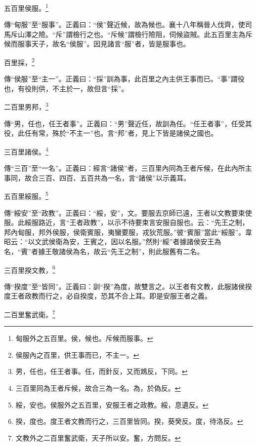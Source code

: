 五百里侯服。\footnote{甸服外之五百里。侯，候也。斥候而服事。}

{\noindent\zhuan{}\fzbyks 傳“甸服”至“服事”。正義曰：“侯”聲近候，故為候也。襄十八年稱晉人伐齊，使司馬斥山澤之險。“斥”謂檢行之也。“斥候”謂檢行險阻，伺候盜賊。此五百里主為斥候而服事天子，故名“侯服”。因見諸言“服”者，皆是服事也。 \par}

百里採，\footnote{侯服內之百里，供王事而已，不主一。}

{\noindent\zhuan{}\fzbyks 傳“侯服”至“主一”。正義曰：“採”訓為事，此百里之內主供王事而已。“事”謂役也，有役則供，不主於一，故但言“採”。 \par}

二百里男邦，\footnote{男，任也，任王者事。任，而針反，又而鴆反，下同。}

{\noindent\zhuan{}\fzbyks 傳“男，任也，任王者事”。正義曰：“男”聲近任，故訓為任。“任王者事”，任受其役，此任有常，殊於“不主一”也。言“邦”者，見上下皆是諸侯之國也。 \par}

三百里諸侯。\footnote{三百里同為王者斥候，故合三為一名。為，於偽反。}

{\noindent\zhuan{}\fzbyks 傳“三百”至“一名”。正義曰：經言“諸侯”者，三百里內同為王者斥候，在此內所主事同，故合三百、四百、五百共為一名，言“諸侯”以示義耳。 \par}

五百里綏服。\footnote{綏，安也。侯服外之五百里，安服王者之政教。綏，息遺反。}

{\noindent\zhuan{}\fzbyks 傳“綏安”至“政教”。正義曰：“綏，安”，文。要服去京師已遠，王者以文教要束使服。此綏服路近，言“王者政教”，以示不待要束言安服自服也。云：“先王之制，邦內甸服，邦外侯服，侯衛賓服，夷蠻要服，戎狄荒服。”彼“賓服”當此“綏服”。韋昭云：“以文武侯衛為安，王賓之，因以名服。”然則“綏”者據諸侯安王為名，“賓”者據王敬諸侯為名，故云“先王之制”，則此服舊有二名。 \par}

三百里揆文教，\footnote{揆，度也。度王者文教而行之，三百里皆同。揆，葵癸反。度，待洛反。}

{\noindent\zhuan{}\fzbyks 傳“揆度”至“皆同”。正義曰：訓“揆”為度，故雙言之。以王者有文教，此服諸侯揆度王者政教而行之，必自揆度，恐其不合上耳。即是安服王者之義。 \par}

二百里奮武衛。\footnote{文教外之二百里奮武衛，天子所以安。奮，方問反。}

